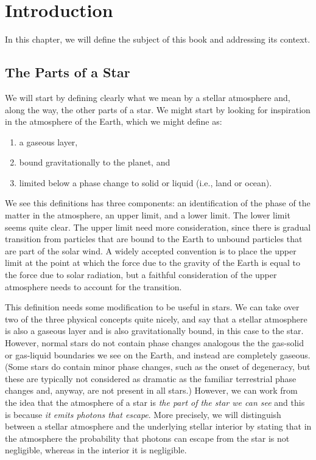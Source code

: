 
\chapter{Introduction}
\label{chapter:introduction}

\noindent
In this chapter, we will define the subject of this book and addressing its context.

\newslide
\section{The Parts of a Star}

We will start by defining clearly what we mean by a stellar atmosphere and, along the way, the other parts of a star. We might start by looking for inspiration in the atmosphere of the Earth, which we might define as:
\begin{enumerate}
    \item a gaseous layer,
    \item bound gravitationally to the planet, and
    \item limited below a phase change to solid or liquid (i.e., land or ocean).
\end{enumerate}
We see this definitions has three components: an identification of the phase of the matter in the atmosphere, an upper limit, and a lower limit. The lower limit seems quite clear. The upper limit need more consideration, since there is gradual transition from particles that are bound to the Earth to unbound particles that are part of the solar wind. A widely accepted convention is to place the upper limit at the point at which the force due to the gravity of the Earth is equal to the force due to solar radiation, but a faithful consideration of the upper atmosphere needs to account for the transition.

\newslide

This definition needs some modification to be useful in stars. We can take over two of the three physical concepts quite nicely, and say that a stellar atmosphere is also a gaseous layer and is also gravitationally bound, in this case to the star. However, normal stars do not contain phase changes analogous the the gas-solid or gas-liquid boundaries we see on the Earth, and instead are completely gaseous. (Some stars do contain minor phase changes, such as the onset of degeneracy, but these are typically not considered as dramatic as the familiar terrestrial phase changes and, anyway, are not present in all stars.) However, we can work from the idea that the atmosphere of a star is \emph{the part of the star we can see} and this is because \emph{it emits photons that escape}. More precisely, we will distinguish between a stellar atmosphere and the underlying stellar interior by stating that in the atmosphere the probability that photons can escape from the star is not negligible, whereas in the interior it is negligible.

